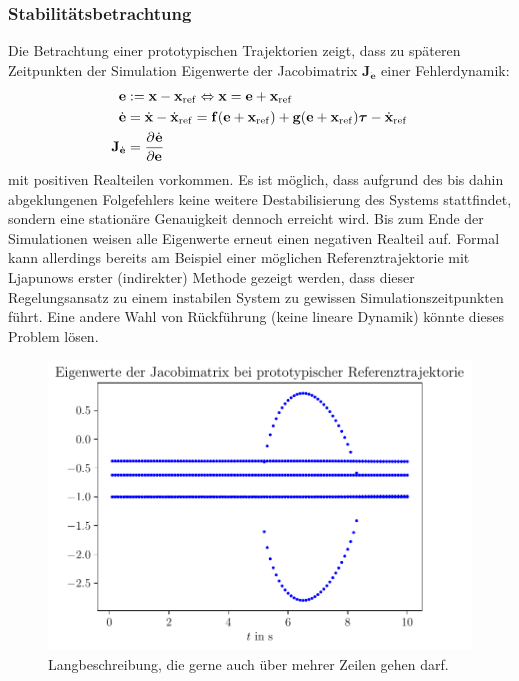 \subsubsection{Stabilitätsbetrachtung}
Die Betrachtung einer prototypischen Trajektorien zeigt, dass zu späteren Zeitpunkten der Simulation Eigenwerte der Jacobimatrix $\mathbf{J}_{\dot{\mathbf{e}}}$ einer Fehlerdynamik:
\begin{align}
	\mathbf{e} &:= \mathbf{x} - \mathbf{x}_{\mathrm{ref}} \Leftrightarrow \mathbf{x} = \mathbf{e} + \mathbf{x}_{\mathrm{ref}} \\
	\dot{\mathbf{e}} &= \dot{\mathbf{x}} - \dot{\mathbf{x}}_{\mathrm{ref}} = \mathbf{f}(\mathbf{e} + \mathbf{x}_{\mathrm{ref}}) + \mathbf{g}(\mathbf{e} + \mathbf{x}_{\mathrm{ref}}) \boldsymbol{\tau} - \dot{\mathbf{x}}_{\mathrm{ref}} \\
	\mathbf{J}_{\dot{\mathbf{e}}} &= \frac{\partial^{}\dot{\mathbf{e}}}{\partial{\mathbf{e}}^{}}
\end{align}
mit positiven Realteilen vorkommen. Es ist möglich, dass aufgrund des bis dahin abgeklungenen Folgefehlers keine weitere Destabilisierung des Systems stattfindet, sondern eine stationäre Genauigkeit dennoch erreicht wird. Bis zum Ende der Simulationen weisen alle Eigenwerte erneut einen negativen Realteil auf. Formal kann allerdings bereits am Beispiel einer möglichen Referenztrajektorie mit Ljapunows erster (indirekter) Methode gezeigt werden, dass dieser Regelungsansatz zu einem instabilen System zu gewissen Simulationszeitpunkten führt. Eine andere Wahl von Rückführung (keine lineare Dynamik) könnte dieses Problem lösen.

\begin{figure}[ht]
	\begin{center}
		\includegraphics[scale=1]{Pictures/feedforward_lin_selec_ljapunov1}
	\end{center}
	\caption[Kurzbeschreibung für Abbildungsverzeichnis]
	{Langbeschreibung, die gerne auch über mehrer Zeilen gehen darf.}
	\label{fig_feedforward_selec_controller_ljapunov1}
\end{figure}

